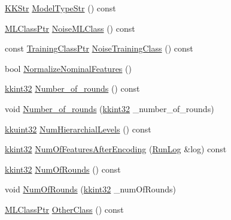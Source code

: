 \begin{DoxyCompactItemize}
\item 
\hyperlink{class_k_k_b_1_1_k_k_str}{K\+K\+Str} \hyperlink{class_k_k_m_l_l_1_1_training_configuration2_afbb93778d0a4c77cd319425705337b44}{Model\+Type\+Str} () const 
\item 
\hyperlink{namespace_k_k_m_l_l_ac272393853d59e72e8456f14cd6d8c23}{M\+L\+Class\+Ptr} \hyperlink{class_k_k_m_l_l_1_1_training_configuration2_a0fe66dc9faecf780d02e5ec70c612bf9}{Noise\+M\+L\+Class} () const 
\item 
const \hyperlink{namespace_k_k_m_l_l_aee99044bdeeb0a43cdc845c2c01b1c14}{Training\+Class\+Ptr} \hyperlink{class_k_k_m_l_l_1_1_training_configuration2_a3fae0dc2f5f2b875c64992f16cef09e1}{Noise\+Training\+Class} () const 
\item 
bool \hyperlink{class_k_k_m_l_l_1_1_training_configuration2_aed8aa06833ab89ab675658a3b5ee7844}{Normalize\+Nominal\+Features} ()
\item 
\hyperlink{namespace_k_k_b_a8fa4952cc84fda1de4bec1fbdd8d5b1b}{kkint32} \hyperlink{class_k_k_m_l_l_1_1_training_configuration2_abae9a557ad0c93cf46fb9b87fce9c11e}{Number\+\_\+of\+\_\+rounds} () const 
\item 
void \hyperlink{class_k_k_m_l_l_1_1_training_configuration2_a1392fef8ec1b1d04ec7e35cebc317190}{Number\+\_\+of\+\_\+rounds} (\hyperlink{namespace_k_k_b_a8fa4952cc84fda1de4bec1fbdd8d5b1b}{kkint32} \+\_\+number\+\_\+of\+\_\+rounds)
\item 
\hyperlink{namespace_k_k_b_af8d832f05c54994a1cce25bd5743e19a}{kkuint32} \hyperlink{class_k_k_m_l_l_1_1_training_configuration2_ae6727c11978b040fe04771db013f5f6c}{Num\+Hierarchial\+Levels} () const 
\item 
\hyperlink{namespace_k_k_b_a8fa4952cc84fda1de4bec1fbdd8d5b1b}{kkint32} \hyperlink{class_k_k_m_l_l_1_1_training_configuration2_ab662cd1d7ed9db5803ec3cbcf76ccfe1}{Num\+Of\+Features\+After\+Encoding} (\hyperlink{class_k_k_b_1_1_run_log}{Run\+Log} \&log) const 
\item 
\hyperlink{namespace_k_k_b_a8fa4952cc84fda1de4bec1fbdd8d5b1b}{kkint32} \hyperlink{class_k_k_m_l_l_1_1_training_configuration2_aafda0b23c696e121c1ac4bf1b105c7ff}{Num\+Of\+Rounds} () const 
\item 
void \hyperlink{class_k_k_m_l_l_1_1_training_configuration2_ae34e099acaeb85a6979d0d11b5aa8906}{Num\+Of\+Rounds} (\hyperlink{namespace_k_k_b_a8fa4952cc84fda1de4bec1fbdd8d5b1b}{kkint32} \+\_\+num\+Of\+Rounds)
\item 
\hyperlink{namespace_k_k_m_l_l_ac272393853d59e72e8456f14cd6d8c23}{M\+L\+Class\+Ptr} \hyperlink{class_k_k_m_l_l_1_1_training_configuration2_aaceb5787826beeee41655b5abd577ced}{Other\+Class} () const 

\end{DoxyCompactItemize}
